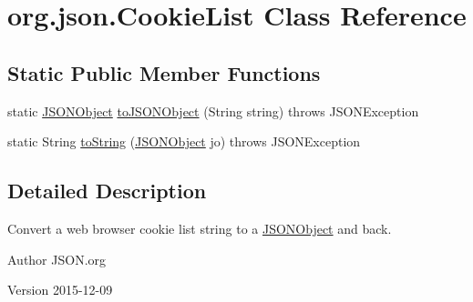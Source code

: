 \hypertarget{classorg_1_1json_1_1CookieList}{\section{org.\-json.\-Cookie\-List Class Reference}
\label{classorg_1_1json_1_1CookieList}
}
\subsection*{Static Public Member Functions}
\begin{DoxyCompactItemize}
\item 
static \hyperlink{classorg_1_1json_1_1JSONObject}{J\-S\-O\-N\-Object} \hyperlink{classorg_1_1json_1_1CookieList_a3f79cd0dadd831ff9bdfb6afd41cd081}{to\-J\-S\-O\-N\-Object} (String string)  throws J\-S\-O\-N\-Exception 
\item 
static String \hyperlink{classorg_1_1json_1_1CookieList_a40f938404f28eda8b66bc17dfcd2261f}{to\-String} (\hyperlink{classorg_1_1json_1_1JSONObject}{J\-S\-O\-N\-Object} jo)  throws J\-S\-O\-N\-Exception 
\end{DoxyCompactItemize}


\subsection{Detailed Description}
Convert a web browser cookie list string to a \hyperlink{classorg_1_1json_1_1JSONObject}{J\-S\-O\-N\-Object} and back. \begin{DoxyAuthor}{Author}
J\-S\-O\-N.\-org 
\end{DoxyAuthor}
\begin{DoxyVersion}{Version}
2015-\/12-\/09 
\end{DoxyVersion}


